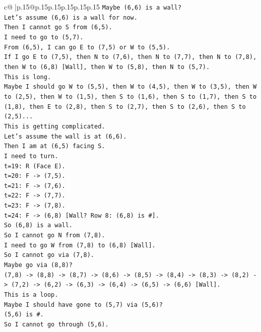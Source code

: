 \documentclass{article}
\begin{document}
{\begin{supertabular}{c@{$\;$}|p{.15\linewidth}@{}p{.15\linewidth}p{.15\linewidth}p{.15\linewidth}p{.15\linewidth}p{.15\linewidth}}
{{{\texttt{Maybe (6,6) is a wall?} \\
\texttt{Let's assume (6,6) is a wall for now.} \\
\texttt{Then I cannot go S from (6,5).} \\
\texttt{I need to go to (5,7).} \\
\texttt{From (6,5), I can go E to (7,5) or W to (5,5).} \\
\texttt{If I go E to (7,5), then N to (7,6), then N to (7,7), then N to (7,8), then W to (6,8) {[}Wall{]}, then W to (5,8), then N to (5,7).} \\
\texttt{This is long.} \\
\texttt{Maybe I should go W to (5,5), then W to (4,5), then W to (3,5), then W to (2,5), then W to (1,5), then S to (1,6), then S to (1,7), then S to (1,8), then E to (2,8), then S to (2,7), then S to (2,6), then S to (2,5)...} \\
\texttt{This is getting complicated.} \\
\texttt{Let's assume the wall is at (6,6).} \\
\texttt{Then I am at (6,5) facing S.} \\
\texttt{I need to turn.} \\
\texttt{t=19: R (Face E).} \\
\texttt{t=20: F {-}> (7,5).} \\
\texttt{t=21: F {-}> (7,6).} \\
\texttt{t=22: F {-}> (7,7).} \\
\texttt{t=23: F {-}> (7,8).} \\
\texttt{t=24: F {-}> (6,8) {[}Wall? Row 8: (6,8) is \#{]}.} \\
\texttt{So (6,8) is a wall.} \\
\texttt{So I cannot go N from (7,8).} \\
\texttt{I need to go W from (7,8) to (6,8) {[}Wall{]}.} \\
\texttt{So I cannot go via (7,8).} \\
\texttt{Maybe go via (8,8)?} \\
\texttt{(7,8) {-}> (8,8) {-}> (8,7) {-}> (8,6) {-}> (8,5) {-}> (8,4) {-}> (8,3) {-}> (8,2) {-}> (7,2) {-}> (6,2) {-}> (6,3) {-}> (6,4) {-}> (6,5) {-}> (6,6) {[}Wall{]}.} \\
\texttt{This is a loop.} \\
\texttt{Maybe I should have gone to (5,7) via (5,6)?} \\
\texttt{(5,6) is \#.} \\
\texttt{So I cannot go through (5,6).} \\
}}}
\end{supertabular}}
\end{document}
